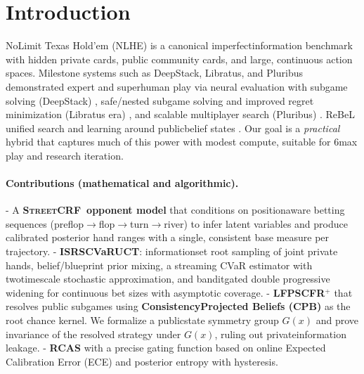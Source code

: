 \documentclass[10pt]{article}
\newcommand{\sCRF}{\textsc{Street\textendash CRF}\xspace}
\newcommand{\1}{\mathbf{1}}
\theoremstyle{plain}
\begin{document}
\section{Introduction}
No\textendash Limit Texas Hold'em (NLHE) is a canonical imperfect\textendash information benchmark with hidden private cards, public community cards, and large, continuous action spaces. Milestone systems such as DeepStack, Libratus, and Pluribus demonstrated expert and superhuman play via neural evaluation with subgame solving (DeepStack) \citep{moravcik2017deepstack}, safe/nested subgame solving and improved regret minimization (Libratus era) \citep{brown2018safe,brown2019dcfr,zinkevich2007cfr,tammelin2014cfrplus}, and scalable multi\textendash player search (Pluribus) \citep{brown2019pluribus}. ReBeL unified search and learning around public\textendash belief states \citep{brown2020rebel}. Our goal is a \emph{practical} hybrid that captures much of this power with modest compute, suitable for 6\textendash max play and research iteration.

\paragraph{Contributions (mathematical and algorithmic).}
- A \textbf{\sCRF\ opponent model} that conditions on position\textendash aware betting sequences (preflop$\to$flop$\to$turn$\to$river) to infer latent variables and produce calibrated posterior hand ranges with a single, consistent base measure per trajectory.
- \textbf{IS\textendash RS\textendash CVaR\textendash UCT}: information\textendash set root sampling of joint private hands, belief/blueprint prior mixing, a streaming CVaR estimator with two\textendash timescale stochastic approximation, and bandit\textendash gated double progressive widening for continuous bet sizes with asymptotic coverage.
- \textbf{LF\textendash PS\textendash CFR$^+$} that re\textendash solves public subgames using \textbf{Consistency\textendash Projected Beliefs (CPB)} as the root chance kernel. We formalize a public\textendash state symmetry group $G(x)$ and prove invariance of the re\textendash solved strategy under $G(x)$, ruling out private\textendash information leakage.
- \textbf{RCAS} with a precise gating function based on online Expected Calibration Error (ECE) and posterior entropy with hysteresis.
\end{document}
